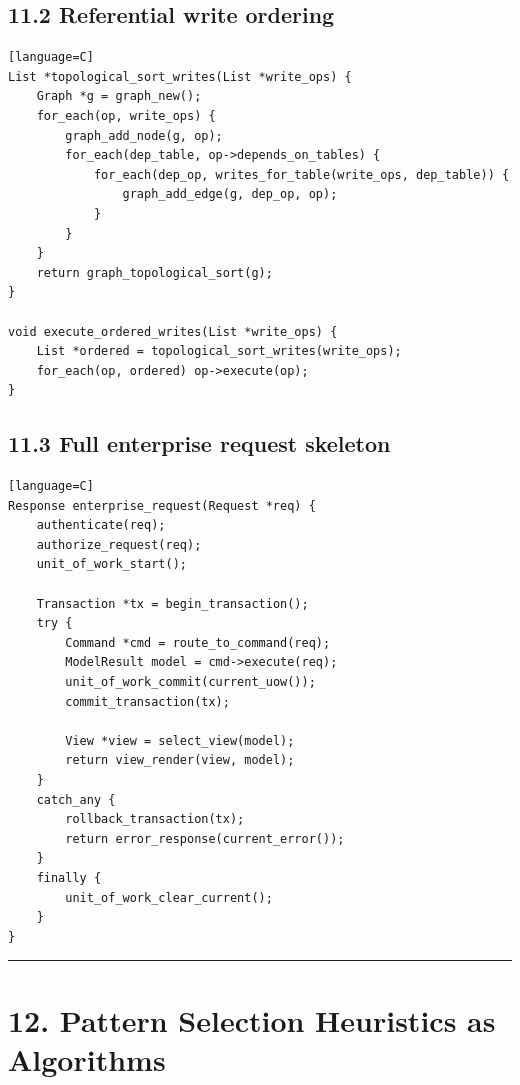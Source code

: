 \documentclass[11pt]{article}
\begin{document}
\subsection{11.2 Referential write
ordering}\label{referential-write-ordering}

\begin{verbatim}[language=C]
List *topological_sort_writes(List *write_ops) {
    Graph *g = graph_new();
    for_each(op, write_ops) {
        graph_add_node(g, op);
        for_each(dep_table, op->depends_on_tables) {
            for_each(dep_op, writes_for_table(write_ops, dep_table)) {
                graph_add_edge(g, dep_op, op);
            }
        }
    }
    return graph_topological_sort(g);
}

void execute_ordered_writes(List *write_ops) {
    List *ordered = topological_sort_writes(write_ops);
    for_each(op, ordered) op->execute(op);
}
\end{verbatim}

\subsection{11.3 Full enterprise request
skeleton}\label{full-enterprise-request-skeleton}

\begin{verbatim}[language=C]
Response enterprise_request(Request *req) {
    authenticate(req);
    authorize_request(req);
    unit_of_work_start();

    Transaction *tx = begin_transaction();
    try {
        Command *cmd = route_to_command(req);
        ModelResult model = cmd->execute(req);
        unit_of_work_commit(current_uow());
        commit_transaction(tx);

        View *view = select_view(model);
        return view_render(view, model);
    }
    catch_any {
        rollback_transaction(tx);
        return error_response(current_error());
    }
    finally {
        unit_of_work_clear_current();
    }
}
\end{verbatim}

\begin{center}\rule{0.5\linewidth}{0.5pt}\end{center}

\section{12. Pattern Selection Heuristics as
Algorithms}\label{pattern-selection-heuristics-as-algorithms}
\end{document}
